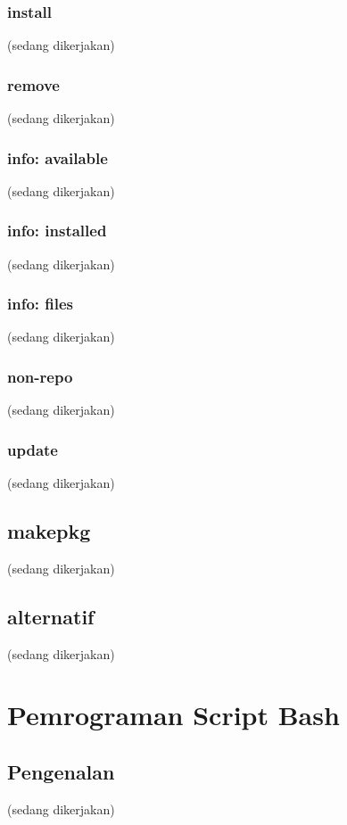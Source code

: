 \documentclass[12pt,]{article}
\begin{document}
	\subsubsection{install}
	(sedang dikerjakan)
	
	\subsubsection{remove}
	(sedang dikerjakan)
	
	\subsubsection{info: available}
	(sedang dikerjakan)

	\subsubsection{info: installed}
	(sedang dikerjakan)
	
	\subsubsection{info: files}
	(sedang dikerjakan)

	\subsubsection{non-repo}
	(sedang dikerjakan)

	\subsubsection{update}
	(sedang dikerjakan)

	\subsection{makepkg}
	(sedang dikerjakan)
	
	\subsection{alternatif}
	(sedang dikerjakan)
		
	\section{Pemrograman Script Bash}
	
	\subsection{Pengenalan}
	(sedang dikerjakan)
	
\end{document}
